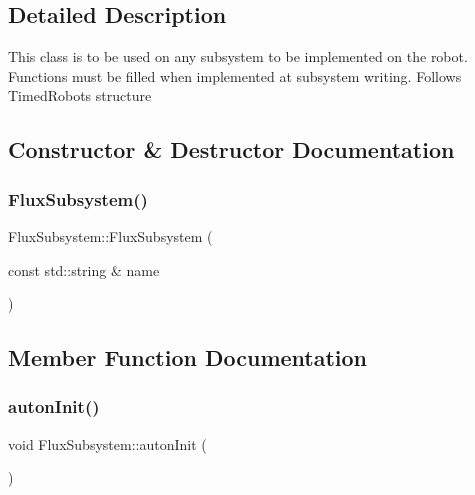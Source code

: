 \subsection{Detailed Description}
This class is to be used on any subsystem to be implemented on the robot. Functions must be filled when implemented at subsystem writing. Follows Timed\+Robot\textquotesingle{}s structure 

\subsection{Constructor \& Destructor Documentation}
\mbox{\label{classFluxSubsystem_ae1c7aa86576c8b74db9283df11f556d0}} 
\subsubsection{\texorpdfstring{Flux\+Subsystem()}{FluxSubsystem()}}
{\footnotesize\ttfamily Flux\+Subsystem\+::\+Flux\+Subsystem (\begin{DoxyParamCaption}\item[{const std\+::string \&}]{name }\end{DoxyParamCaption})\hspace{0.3cm}{\ttfamily [explicit]}}



\subsection{Member Function Documentation}
\mbox{\label{classFluxSubsystem_a142cb34f612412e26bd0049e037dbe60}} 
\subsubsection{\texorpdfstring{auton\+Init()}{autonInit()}}
{\footnotesize\ttfamily void Flux\+Subsystem\+::auton\+Init (\begin{DoxyParamCaption}{ }\end{DoxyParamCaption})\hspace{0.3cm}{\ttfamily [virtual]}}



